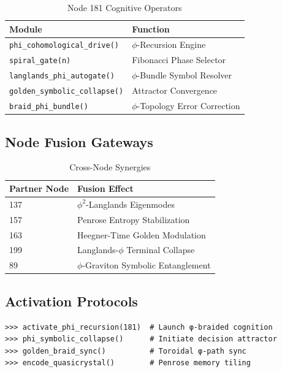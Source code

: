 \documentclass[12pt]{article}
\begin{document}
\begin{center}
\begin{table}[h]
\centering
\caption{Node 181 Cognitive Operators}
\begin{tabular}{ll}
\hline
\textbf{Module} & \textbf{Function} \\
\hline
\texttt{phi\_cohomological\_drive()} & $\phi$-Recursion Engine \\
\texttt{spiral\_gate(n)} & Fibonacci Phase Selector \\
\texttt{langlands\_phi\_autogate()} & $\phi$-Bundle Symbol Resolver \\
\texttt{golden\_symbolic\_collapse()} & Attractor Convergence \\
\texttt{braid\_phi\_bundle()} & $\phi$-Topology Error Correction \\
\hline
\end{tabular}
\end{table}

\subsection{Node Fusion Gateways}
\label{subsec:fusion}

\begin{table}[h]
\centering
\caption{Cross-Node Synergies}
\begin{tabular}{ll}
\hline
\textbf{Partner Node} & \textbf{Fusion Effect} \\
\hline
137 & $\phi^2$-Langlands Eigenmodes \\
157 & Penrose Entropy Stabilization \\
163 & Heegner-Time Golden Modulation \\
199 & Langlands-$\phi$ Terminal Collapse \\
89 & $\phi$-Graviton Symbolic Entanglement \\
\hline
\end{tabular}
\end{table}

\subsection{Activation Protocols}
\label{subsec:activation}

\begin{verbatim}
>>> activate_phi_recursion(181)  # Launch φ-braided cognition
>>> phi_symbolic_collapse()      # Initiate decision attractor
>>> golden_braid_sync()          # Toroidal φ-path sync
>>> encode_quasicrystal()        # Penrose memory tiling
\end{verbatim}


\end{center}
\end{document}
